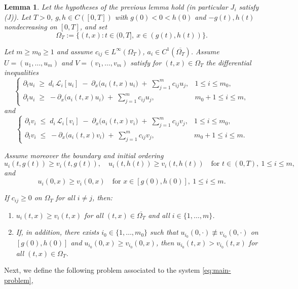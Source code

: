 \documentclass[a4paper,11pt]{amsart}
\newtheorem{lemma}[theorem]{Lemma}
\theoremstyle{definition}
\numberwithin{equation}{section}
\theoremstyle{definition}
\begin{document}
\begin{lemma}\label{ComparaisonlEMMA}
Let the hypotheses of the previous lemma hold (in particular $J_i$ satisfy (J)).
Let $T>0$, $g,h\in C([0,T])$ with $g(0)<0<h(0)$ and $-g(t),h(t)$ nondecreasing on $[0,T]$, and set
\[
\Omega_T:=\{(t,x):t\in(0,T],\ x\in(g(t),h(t))\}.
\]

Let $m\ge m_0\geq1$ and assume $c_{ij}\in L^\infty(\Omega_T)$, $a_i\in C^1(\overline{\Omega_T})$.
Assume $U=(u_1,\dots,u_m)$ and $V=(v_1,\dots,v_m)$ satisfy for $(t,x)\in\Omega_T$ the differential inequalities
\[
\begin{cases}
\partial_t u_i \;\geq\; d_i\,\mathcal L_i[u_i] \;-\; \partial_x\!\big(a_i(t,x)u_i\big)
\;+\;\displaystyle\sum_{j=1}^m c_{ij}u_j, & 1\le i\leq m_0,\\[6pt]
\partial_t u_i \;\geq\; -\partial_x\!\big(a_i(t,x)u_i\big)
\;+\;\displaystyle\sum_{j=1}^m c_{ij}u_j, & m_0+1\leq i\leq m,
\end{cases}
\]
and
\[
\begin{cases}
\partial_t v_i \;\le\; d_i\,\mathcal L_i[v_i] \;-\; \partial_x\!\big(a_i(t,x)v_i\big)
\;+\;\displaystyle\sum_{j=1}^m c_{ij}v_j, & 1\leq i\leq m_0,\\[6pt]
\partial_t v_i \;\leq\; -\partial_x\!\big(a_i(t,x)v_i\big)
\;+\;\displaystyle\sum_{j=1}^m c_{ij}v_j, & m_0+1\le i\leq m.
\end{cases}
\]

Assume moreover the boundary and initial ordering
\[
u_i(t,g(t))\geq v_i(t,g(t)),\quad u_i(t,h(t))\geq v_i(t,h(t))\quad\text{for }t\in(0,T),\ 1\le i\le m,
\]
and
\[
u_i(0,x)\geq v_i(0,x)\quad\text{for }x\in[g(0),h(0)],\ 1\leq i\leq m.
\]

If $c_{ij}\ge0$ on $\Omega_T$ for all $i\ne j$, then:
\begin{enumerate}
  \item $u_i(t,x)\geq v_i(t,x)$ for all $(t,x)\in\overline{\Omega_T}$ and all $i\in\{1,\dots,m\}$.
  \item If, in addition, there exists $i_0\in\{1,\dots,m_0\}$ such that
  $u_{i_0}(0,\cdot)\not\equiv v_{i_0}(0,\cdot)$ on $[g(0),h(0)]$ and $u_{i_0}(0,x)\geq v_{i_0}(0,x)$,
  then $u_{i_0}(t,x)>v_{i_0}(t,x)$ for all $(t,x)\in\Omega_T$.
\end{enumerate}
\end{lemma}


Next, we define the following problem associated to the system \eqref{eq:main-problem},
\end{document}
